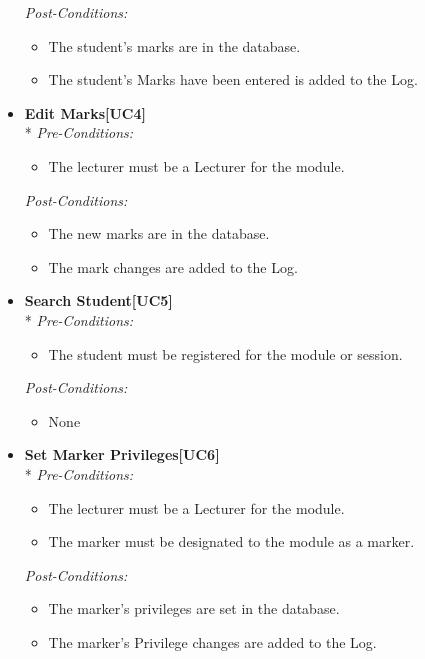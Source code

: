 \documentclass[a4paper]{article}
\begin{document}
\begin{itemize}
						\textit{Post-Conditions:}
								\begin{itemize}
									\item The student's marks are in the database.
									\item The student's Marks have been entered is added to the Log.
								\end{itemize}
														
				\item	\textbf{Edit Marks[UC4]}\\*
						\textit{Pre-Conditions:}
								\begin{itemize}
									\item The lecturer must be a Lecturer for the module.
								\end{itemize}
								
						\textit{Post-Conditions:}
								\begin{itemize}
									\item The new marks are in the database.
									\item The mark changes are added to the Log.
								\end{itemize}
														
				\item	\textbf{Search Student[UC5]}\\*
						\textit{Pre-Conditions:}
								\begin{itemize}
									\item The student must be registered for the module or session.
								\end{itemize}
								
						\textit{Post-Conditions:}
								\begin{itemize}
									\item None
								\end{itemize}
														
				\item	\textbf{Set Marker Privileges[UC6]}\\*
						\textit{Pre-Conditions:}
								\begin{itemize}
									\item The lecturer must be a Lecturer for the module.
									\item The marker must be designated to the module as a marker.
								\end{itemize}
								
						\textit{Post-Conditions:}
								\begin{itemize}
									\item The marker's privileges are set in the database.
									\item The marker's Privilege changes are added to the Log.
								\end{itemize}
														

\end{itemize}
\end{document}
